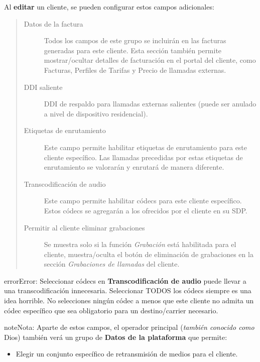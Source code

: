 \documentclass[letterpaper,10pt,spanish]{sphinxmanual}
\begin{document}
Al \textbf{editar} un cliente, se pueden configurar estos campos adicionales:
\begin{quote}
\begin{description}
\item[{Datos de la factura}] \leavevmode
Todos los campos de este grupo se incluirán en las facturas generadas para este cliente. Esta sección también permite mostrar/ocultar detalles de facturación en el portal del cliente, como Facturas, Perfiles de Tarifas y Precio de llamadas externas.

\item[{DDI saliente}] \leavevmode
DDI de respaldo para llamadas externas salientes (puede ser anulado a nivel de dispositivo residencial).

\item[{Etiquetas de enrutamiento}] \leavevmode
Este campo permite habilitar etiquetas de enrutamiento para este cliente específico. Las llamadas precedidas por estas etiquetas de enrutamiento se valorarán y enrutará de manera diferente.

\item[{Transcodificación de audio}] \leavevmode
Este campo permite habilitar códecs para este cliente específico. Estos códecs se agregarán a los ofrecidos por el cliente en su SDP.

\item[{Permitir al cliente eliminar grabaciones}] \leavevmode
Se muestra solo si la función \emph{Grabación} está habilitada para el cliente, muestra/oculta el botón de eliminación de grabaciones en la sección \emph{Grabaciones de llamadas} del cliente.

\end{description}
\end{quote}

\begin{notice}{error}{Error:}
Seleccionar códecs en \textbf{Transcodificación de audio} puede llevar a una transcodificación innecesaria. Seleccionar TODOS los códecs siempre es una idea horrible. No selecciones ningún códec a menos que este cliente no admita un códec específico que sea obligatorio para un destino/carrier necesario.
\end{notice}

\begin{notice}{note}{Nota:}
Aparte de estos campos, el operador principal (\emph{también conocido como} Dios) también verá un grupo de \textbf{Datos de la plataforma} que permite:
\begin{itemize}
\item {} 
Elegir un conjunto específico de retransmisión de medios para el cliente.

\end{itemize}
\end{notice}
\end{document}
